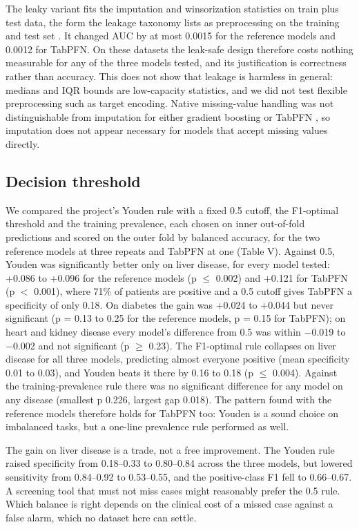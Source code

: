 \documentclass[conference]{IEEEtran}
\begin{document}
The leaky variant fits the imputation and winsorization statistics on train plus test data, the form the leakage taxonomy lists as preprocessing on the training and test set \cite{kapoor2023}. It changed AUC by at most 0.0015 for the reference models and 0.0012 for TabPFN. On these datasets the leak-safe design therefore costs nothing measurable for any of the three models tested, and its justification is correctness rather than accuracy. This does not show that leakage is harmless in general: medians and IQR bounds are low-capacity statistics, and we did not test flexible preprocessing such as target encoding. Native missing-value handling was not distinguishable from imputation for either gradient boosting or TabPFN \cite{hollmann2025}, so imputation does not appear necessary for models that accept missing values directly.

\subsection{Decision threshold}

We compared the project's Youden rule with a fixed 0.5 cutoff, the F1-optimal threshold and the training prevalence, each chosen on inner out-of-fold predictions and scored on the outer fold by balanced accuracy, for the two reference models at three repeats and TabPFN at one (Table V). Against 0.5, Youden was significantly better only on liver disease, for every model tested: +0.086 to +0.096 for the reference models (p $\le$ 0.002) and +0.121 for TabPFN (p $<$ 0.001), where 71\% of patients are positive and a 0.5 cutoff gives TabPFN a specificity of only 0.18. On diabetes the gain was +0.024 to +0.044 but never significant (p = 0.13 to 0.25 for the reference models, p = 0.15 for TabPFN); on heart and kidney disease every model's difference from 0.5 was within $-$0.019 to $-$0.002 and not significant (p $\ge$ 0.23). The F1-optimal rule collapses on liver disease for all three models, predicting almost everyone positive (mean specificity 0.01 to 0.03), and Youden beats it there by 0.16 to 0.18 (p $\le$ 0.004). Against the training-prevalence rule there was no significant difference for any model on any disease (smallest p 0.226, largest gap 0.018). The pattern found with the reference models therefore holds for TabPFN too: Youden is a sound choice on imbalanced tasks, but a one-line prevalence rule performed as well.

The gain on liver disease is a trade, not a free improvement. The Youden rule raised specificity from 0.18--0.33 to 0.80--0.84 across the three models, but lowered sensitivity from 0.84--0.92 to 0.53--0.55, and the positive-class F1 fell to 0.66--0.67. A screening tool that must not miss cases might reasonably prefer the 0.5 rule. Which balance is right depends on the clinical cost of a missed case against a false alarm, which no dataset here can settle.
\end{document}
